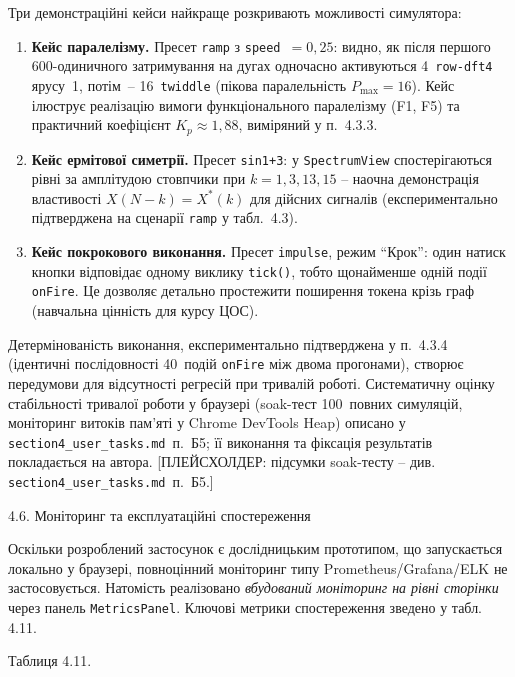\documentclass[
]{article}
\begin{document}
Три демонстраційні кейси найкраще розкривають можливості симулятора:

\begin{enumerate}
\def\labelenumi{\arabic{enumi}.}
\item
  \textbf{Кейс паралелізму.} Пресет \texttt{ramp} з
  \texttt{speed}~\(= 0{,}25\): видно, як після першого 600-одиничного
  затримування на дугах одночасно активуються 4~\texttt{row-dft4} ярусу~1,
  потім~-- 16~\texttt{twiddle} (пікова паралельність \(P_{\max} = 16\)).
  Кейс ілюструє реалізацію вимоги функціонального паралелізму (F1, F5)
  та практичний коефіцієнт \(K_{p} \approx 1{,}88\), виміряний у
  п.~4.3.3.
\item
  \textbf{Кейс ермітової симетрії.} Пресет \texttt{sin1+3}: у
  \texttt{SpectrumView} спостерігаються рівні за амплітудою стовпчики
  при \(k = 1,3,13,15\) -- наочна демонстрація властивості
  \(X(N - k) = X^{*}(k)\) для дійсних сигналів (експериментально
  підтверджена на сценарії \texttt{ramp} у табл.~4.3).
\item
  \textbf{Кейс покрокового виконання.} Пресет \texttt{impulse}, режим
  ``Крок'': один натиск кнопки відповідає одному виклику
  \texttt{tick()}, тобто щонайменше одній події \texttt{onFire}. Це
  дозволяє детально простежити поширення токена крізь граф (навчальна
  цінність для курсу ЦОС).
\end{enumerate}

Детермінованість виконання, експериментально підтверджена у п.~4.3.4
(ідентичні послідовності 40~подій \texttt{onFire} між двома прогонами),
створює передумови для відсутності регресій при тривалій роботі.
Систематичну оцінку стабільності тривалої роботи у браузері (soak-тест
100~повних симуляцій, моніторинг витоків пам'яті у Chrome DevTools
Heap) описано у \texttt{section4\_user\_tasks.md}~п.~Б5; її виконання
та фіксація результатів покладається на автора. [ПЛЕЙСХОЛДЕР: підсумки
soak-тесту -- див. \texttt{section4\_user\_tasks.md}~п.~Б5.]

\protect{}\label{Xddcc2d41e218d4eab0104affeeaeb116ef3d72e}{}4.6.
Моніторинг та експлуатаційні спостереження

Оскільки розроблений застосунок є дослідницьким прототипом, що
запускається локально у браузері, повноцінний моніторинг типу
Prometheus/Grafana/ELK не застосовується. Натомість реалізовано
\emph{вбудований моніторинг на рівні сторінки} через панель
\texttt{MetricsPanel}. Ключові метрики спостереження зведено у табл.
4.11.

Таблиця 4.11.
\end{document}
